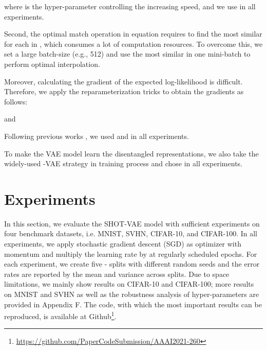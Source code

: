 \documentclass[letterpaper]{article}
\begin{document}
where  is the hyper-parameter controlling the increasing speed, and we use  in all experiments.

Second, the optimal match operation in equation  requires to find the most similar  for each  in , which consumes a lot of computation resources. To overcome this, we set a large batch-size (e.g., 512) and use the most similar  in one mini-batch to perform optimal interpolation.

Moreover, calculating the gradient of the expected log-likelihood  is difficult. Therefore, we apply the reparameterization tricks  \cite{DBLP:conf/icml/RezendeMW14,DBLP:conf/iclr/JangGP17} to obtain the gradients as follows:

and

Following previous works \citep{DBLP:conf/nips/Dupont18}, we used  and  in all experiments.

To make the VAE model learn the disentangled representations, we also take the widely-used -VAE strategy \citep{DBLP:journals/corr/abs-1804-03599} in training process and chose  in all experiments. 


 \section{Experiments}
\label{sec:experiments}
In this section, we evaluate the SHOT-VAE model with sufficient experiments on four benchmark datasets, i.e. MNIST, SVHN, CIFAR-10, and CIFAR-100. In all experiments, we apply stochastic gradient descent (SGD) as optimizer with momentum  and multiply the learning rate by  at regularly scheduled epochs. For each experiment, we create five - splits with different random seeds and the error rates are reported by the mean and variance across splits. Due to space limitations, we mainly show results on CIFAR-10 and CIFAR-100; more results on MNIST and SVHN as well as the robustness analysis of hyper-parameters are provided in Appendix F. The code, with which the most important results can be reproduced, is available at Github\footnote{\url{https://github.com/PaperCodeSubmission/AAAI2021-260}}. 
\end{document}
